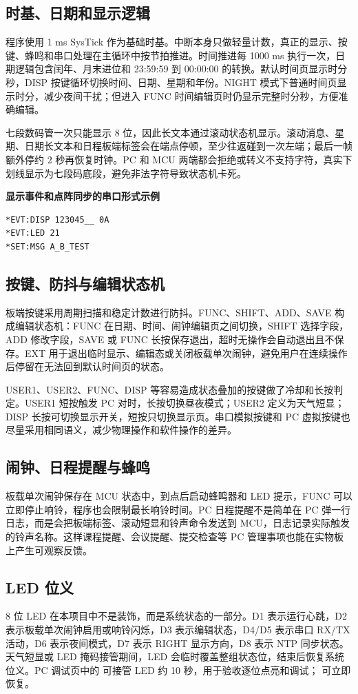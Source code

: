 \documentclass[UTF8,zihao=-4,a4paper]{ctexart}
\newcommand{\code}[1]{\texttt{\detokenize{#1}}}
\begin{document}
\subsection{时基、日期和显示逻辑}
程序使用 1 ms SysTick 作为基础时基。中断本身只做轻量计数，真正的显示、按键、蜂鸣和串口处理在主循环中按节拍推进。时间推进每 1000 ms 执行一次，日期逻辑包含闰年、月末进位和 23:59:59 到 00:00:00 的转换。默认时间页显示时分秒，DISP 按键循环切换时间、日期、星期和年份。NIGHT 模式下普通时间页显示时分，减少夜间干扰；但进入 FUNC 时间编辑页时仍显示完整时分秒，方便准确编辑。

七段数码管一次只能显示 8 位，因此长文本通过滚动状态机显示。滚动消息、星期、日期长文本和日程板端标签会在端点停顿，至少往返碰到一次左端；最后一帧额外停约 2 秒再恢复时钟。PC 和 MCU 两端都会拒绝或转义不支持字符，真实下划线显示为七段码底段，避免非法字符导致状态机卡死。

\noindent\textbf{显示事件和点阵同步的串口形式示例}
\begin{verbatim}
*EVT:DISP 123045__ 0A
*EVT:LED 21
*SET:MSG A_B_TEST
\end{verbatim}

\subsection{按键、防抖与编辑状态机}
板端按键采用周期扫描和稳定计数进行防抖。FUNC、SHIFT、ADD、SAVE 构成编辑状态机：FUNC 在日期、时间、闹钟编辑页之间切换，SHIFT 选择字段，ADD 修改字段，SAVE 或 FUNC 长按保存退出，超时无操作会自动退出且不保存。EXT 用于退出临时显示、编辑态或关闭板载单次闹钟，避免用户在连续操作后停留在无法回到默认时间页的状态。

USER1、USER2、FUNC、DISP 等容易造成状态叠加的按键做了冷却和长按判定。USER1 短按触发 PC 对时，长按切换昼夜模式；USER2 定义为天气短显；DISP 长按可切换显示开关，短按只切换显示页。串口模拟按键和 PC 虚拟按键也尽量采用相同语义，减少物理操作和软件操作的差异。

\subsection{闹钟、日程提醒与蜂鸣}
板载单次闹钟保存在 MCU 状态中，到点后启动蜂鸣器和 LED 提示，FUNC 可以立即停止响铃，程序也会限制最长响铃时间。PC 日程提醒不是简单在 PC 弹一行日志，而是会把板端标签、滚动短显和铃声命令发送到 MCU，日志记录实际触发的铃声名称。这样课程提醒、会议提醒、提交检查等 PC 管理事项也能在实物板上产生可观察反馈。

\subsection{LED 位义}
8 位 LED 在本项目中不是装饰，而是系统状态的一部分。D1 表示运行心跳，D2 表示板载单次闹钟启用或响铃闪烁，D3 表示编辑状态，D4/D5 表示串口 RX/TX 活动，D6 表示夜间模式，D7 表示 RIGHT 显示方向，D8 表示 NTP 同步状态。天气短显或 LED 掩码接管期间，LED 会临时覆盖整组状态位，结束后恢复系统位义。PC 调试页中的 \code{*SET:LED XX} 可接管 LED 约 10 秒，用于验收逐位点亮和调试；\code{*SET:LED 00} 可立即恢复。
\end{document}
